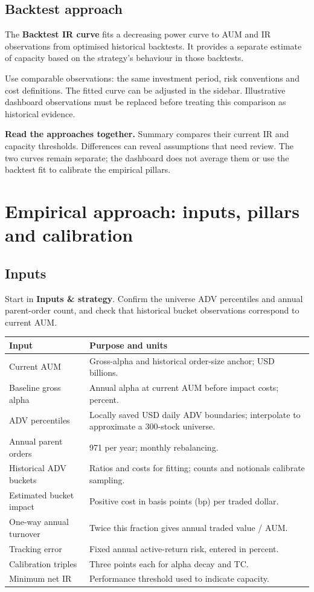 \documentclass[11pt,a4paper]{article}
\begin{document}
\subsection{Backtest approach}
The \textbf{Backtest IR curve} fits a decreasing power curve to AUM and IR observations from optimised historical backtests. It provides a separate estimate of capacity based on the strategy's behaviour in those backtests.

Use comparable observations: the same investment period, risk conventions and cost definitions. The fitted curve can be adjusted in the sidebar. Illustrative dashboard observations must be replaced before treating this comparison as historical evidence.

\textbf{Read the approaches together.} Summary compares their current IR and capacity thresholds. Differences can reveal assumptions that need review. The two curves remain separate; the dashboard does not average them or use the backtest fit to calibrate the empirical pillars.

\newpage
\section{Empirical approach: inputs, pillars and calibration}
\subsection{Inputs}
Start in \textbf{Inputs \& strategy}. Confirm the universe ADV percentiles and annual parent-order count, and check that historical bucket observations correspond to current AUM.

{\small
\begin{tabularx}{\textwidth}{@{}p{}L@{}}
\toprule
Input & Purpose and units \\
\midrule
Current AUM & Gross-alpha and historical order-size anchor; USD billions. \\
Baseline gross alpha & Annual alpha at current AUM before impact costs; percent. \\
ADV percentiles & Locally saved USD daily ADV boundaries; interpolate to approximate a 300-stock universe. \\
Annual parent orders & 971 per year; monthly rebalancing. \\
Historical ADV buckets & Ratios and costs for fitting; counts and notionals calibrate sampling. \\
Estimated bucket impact & Positive cost in basis points (bp) per traded dollar. \\
One-way annual turnover & Twice this fraction gives annual traded value / AUM. \\
Tracking error & Fixed annual active-return risk, entered in percent. \\
Calibration triples & Three points each for alpha decay and TC. \\
Minimum net IR & Performance threshold used to indicate capacity. \\
\bottomrule
\end{tabularx}
}
\end{document}
